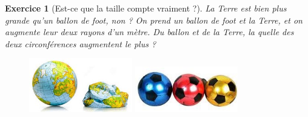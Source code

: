 \documentclass[12pt]{article}
\theoremstyle{break}
\newtheorem{exo}{Exercice}
\begin{document}
\begin{exo}[Est-ce que la taille compte vraiment ?]
La Terre est bien plus grande qu'un ballon de foot, non ? On prend un ballon de foot et la Terre, et on augmente leur deux rayons d'un mètre. Du ballon et de la Terre, la quelle des deux circonférences augmentent le plus ?

\begin{figure}[h!]
	\centering
    \includegraphics[width=0.4\textwidth]{Terre.jpg}
    \includegraphics[width=0.4\textwidth]{BallonFoot.jpg}
\end{figure}
\end{exo}
\end{document}
